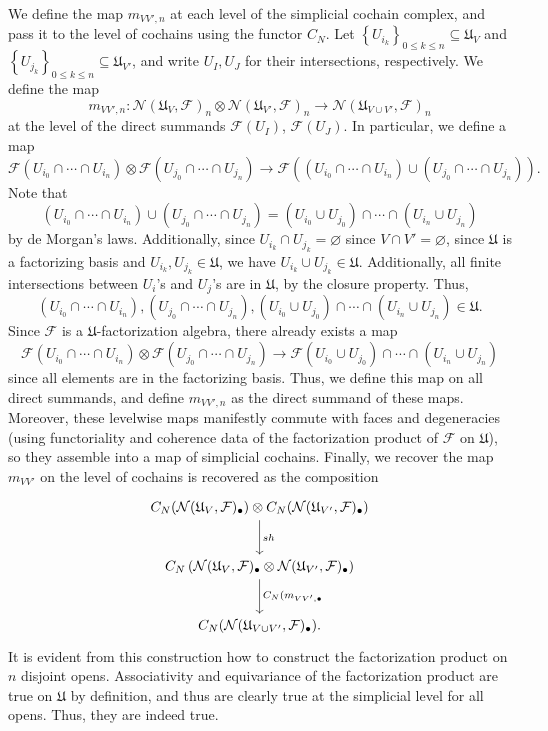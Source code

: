 We define the map $m_{VV',n} $ at each level of the simplicial cochain complex, and pass it to the level of cochains using the functor $C_N$. Let $\left\{ U_{i_k}  \right\}_{0\leq k\leq n} \subseteq \mathfrak{U}_V$ and $\left\{ U_{j_k}  \right\}_{0\leq k\leq n} \subseteq \mathfrak{U} _{V'} $, and write $U_I,U_J$ for their intersections, respectively. We define the map
\[
m_{VV',n} :	\mathcal{N} (\mathfrak{U}_V,\mathcal{F} )_{n} \otimes  \mathcal{N} (\mathfrak{U} _{V'} ,\mathcal{F} )_n \to \mathcal{N} (\mathfrak{U} _{V\cup V'} ,\mathcal{F} )_n
\]
at the level of the direct summands $\mathcal{F} (U_{I} )$, $\mathcal{F} (U_J)$. In particular, we define a map
\[
	\mathcal{F} (U_{i_0} \cap \cdots \cap U_{i_n} )\otimes \mathcal{F} (U_{j_0} \cap \cdots \cap U_{j_n} )\to \mathcal{F} \left( (U_{i_0} \cap \cdots \cap U_{i_n} ) \cup (U_{j_0} \cap \cdots \cap U_{j_n} ) \right) 
.\]
Note that
\[
	(U_{i_0} \cap \cdots \cap U_{i_n} ) \cup (U_{j_0} \cap \cdots \cap U_{j_n} ) = \left( U_{i_0} \cup U_{j_0}  \right) \cap \cdots \cap \left( U_{i_n} \cup U_{j_n}  \right) 
\]
by de Morgan's laws. Additionally, since $U_{i_k} \cap U_{j_k} =\varnothing $ since $V \cap V'=\varnothing $, since $\mathfrak{U} $ is a factorizing basis and $U_{i_k} ,U_{j_k} \in \mathfrak{U} $, we have $U_{i_k} \cup U_{j_k} \in \mathfrak{U} $. Additionally, all finite intersections between $U_i$'s and $U_j$'s are in $\mathfrak{U} $, by the closure property. Thus,
\[
(U_{i_0} \cap \cdots \cap U_{i_n} ), (U_{j_0} \cap \cdots \cap U_{j_n} ),\left( U_{i_0} \cup U_{j_0}  \right) \cap \cdots \cap \left( U_{i_n} \cup U_{j_n}  \right) \in \mathfrak{U} 
.\]
Since $\mathcal{F} $ is a $\mathfrak{U} $-factorization algebra, there already exists a map
\[
	\mathcal{F}(U_{i_0} \cap \cdots \cap U_{i_n} ) \otimes \mathcal{F} (U_{j_0} \cap \cdots \cap U_{j_n} ) \to \mathcal{F} \left( U_{i_0} \cup U_{j_0}  \right) \cap \cdots \cap \left( U_{i_n} \cup U_{j_n}  \right) 
\]
since all elements are in the factorizing basis. Thus, we define this map on all direct summands, and define $m_{VV',n} $ as the direct summand of these maps. Moreover, these levelwise maps manifestly commute with faces and degeneracies (using functoriality and coherence data of the factorization product of $\mathcal{F} $ on $\mathfrak{U} $), so they assemble into a map of simplicial cochains. Finally, we recover the map $m_{VV'} $ on the level of cochains is recovered as the composition
\[\begin{tikzcd}[row sep = 2.5em, column sep = 2.5em]
C_N(\mathcal{N} (\mathfrak{U}_V,\mathcal{F} )_{\bullet} )\otimes C_N(\mathcal{N} (\mathfrak{U} _{V'} ,\mathcal{F} )_{\bullet} )\ar[" sh ", d]  \\
C_N\left( \mathcal{N} (\mathfrak{U}_V,\mathcal{F} )_{\bullet} \otimes \mathcal{N} (\mathfrak{U} _{V'} ,\mathcal{F} )_{\bullet}  \right) \ar[" C_N(m_{VV',\bullet} ", d]  \\
C_N(\mathcal{N} (\mathfrak{U}_{V \cup V'} ,\mathcal{F} )_{\bullet} ).
\end{tikzcd}\]
It is evident from this construction how to construct the factorization product on $n$ disjoint opens. Associativity and equivariance of the factorization product are true on $\mathfrak{U} $ by definition, and thus are clearly true at the simplicial level for all opens. Thus, they are indeed true.

